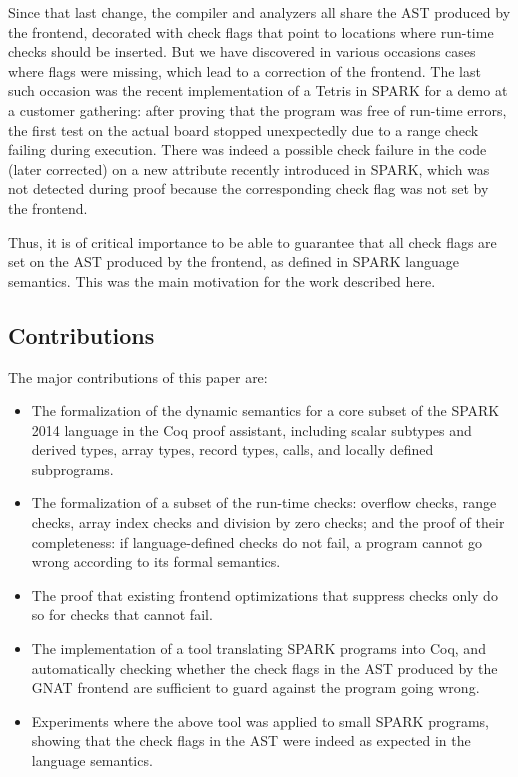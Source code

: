 Since that last change, the compiler and analyzers all share the AST produced
by the frontend, decorated with check flags that point to locations where
run-time checks should be inserted. But we have discovered in various occasions
cases where flags were missing, which lead to a correction of the frontend. The
last such occasion was the recent implementation of a Tetris in SPARK for a
demo at a customer gathering: after proving that the program was free of
run-time errors, the first test on the actual board stopped unexpectedly due to
a range check failing during execution. There was indeed a possible check
failure in the code (later corrected) on a new attribute recently introduced in
SPARK, which was not detected during proof because the corresponding check flag
was not set by the frontend.

Thus, it is of critical importance to be able to guarantee that all check flags
are set on the AST produced by the frontend, as defined in SPARK language
semantics. This was the main motivation for the work described here.

\subsection{Contributions}
The major contributions of this paper are:
\begin{itemize}
\item The formalization of the dynamic semantics for a core subset of the SPARK
  2014 language in the Coq proof assistant, including scalar subtypes and
  derived types, array types, record types, calls, and locally defined
  subprograms.
\item The formalization of a subset of the run-time checks: overflow checks,
  range checks, array index checks and division by zero checks; and the proof
  of their completeness: if language-defined checks do not fail, a program
  cannot go wrong according to its formal semantics.
\item The proof that existing frontend optimizations that suppress checks only
  do so for checks that cannot fail.
\item The implementation of a tool translating SPARK programs into Coq, and
  automatically checking whether the check flags in the AST produced by the
  GNAT frontend are sufficient to guard against the program going wrong.
\item Experiments where the above tool was applied to small SPARK programs,
  showing that the check flags in the AST were indeed as expected in the
  language semantics.
\end{itemize}
